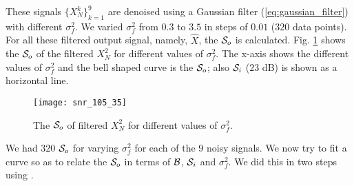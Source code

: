 \documentclass[journal,onecolumn]{IEEEtran}
\newcommand{\Noise}{N}
\newcommand{\Signal}{X}
\newcommand{\g}{f}
\renewcommand{\S}{{\cal S}}
\newcommand{\BW}{{\cal B}}
\begin{document}
 These signals $\{ \Signal_\Noise^k \}_{k=1}^9$ are denoised using a 
Gaussian filter (\ref{eq:gaussian_filter}) with different $\sigma_\g^2$. 
We varied $\sigma_\g^2$ from $0.3$ to $3.5$ in steps 
of $0.01$ ($320$ data points). For all 
these filtered output signal, namely, $\hat{X}$, the $\S_o$ is 
calculated. Fig. \ref{fig:snr_plot} shows the $\S_o$ of the filtered 
$\Signal_\Noise^2$ for different values of $\sigma_\g^2$. The x-axis shows 
the different values of $\sigma_\g^2$ and the bell shaped curve is the 
$\S_o$; also $\S_i$ ($23$ dB) is shown as a horizontal line. 
 \begin{figure} 
 \centerline{\texttt{[image: snr\_105\_35]}} 
 \caption{The $\S_o$ of filtered $\Signal_\Noise^2$ for different values 
of $\sigma_\g^2$.}
 \label{fig:snr_plot}
 \end{figure}
We had $320$ $\S_o$ for varying $\sigma_\g^2$ for each of the $9$ 
noisy signals. We now try to fit a curve so as to relate the $\S_o$ in terms of 
$\BW$, $\S_i$ and 
$\sigma_\g^2$.  
We did this in two steps using \cite{web:curve_fit}.
\end{document}

